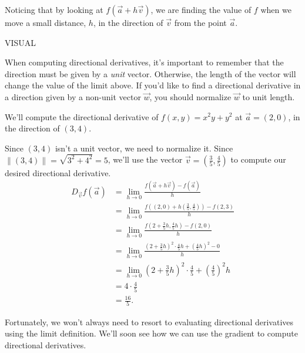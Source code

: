 \documentclass{ximera}
\begin{document}
Noticing that by looking at $f(\vec{a}+h\vec{v})$, we are finding the value of $f$ when we move a small distance, $h$, in the direction of $\vec{v}$ from the point $\vec{a}$.

VISUAL

When computing directional derivatives, it's important to remember that the direction must be given by a \emph{unit} vector. Otherwise, the length of the vector will change the value of the limit above. If you'd like to find a directional derivative in a direction given by a non-unit vector $\vec{w}$, you should normalize $\vec{w}$ to unit length.

\begin{example}
We'll compute the directional derivative of $f(x,y) = x^2y+y^2$ at $\vec{a}=(2,0)$, in the direction of $(3,4)$.

Since $(3,4)$ isn't a unit vector, we need to normalize it. Since $\|(3,4)\| = \sqrt{3^2+4^2}=5$, we'll use the vector $\vec{v}=\left(\frac{3}{5},\frac{4}{5}\right)$ to compute our desired directional derivative.
\begin{align*}
D_{\vec{v}}f(\vec{a}) &= \lim_{h\rightarrow 0}\frac{f(\vec{a}+h\vec{v})-f(\vec{a})}{h}\\
&= \lim_{h\rightarrow 0}\frac{f\left((2,0) + h\left(\frac{3}{5},\frac{4}{5}\right)\right)-f(2,3)}{h}\\
&= \lim_{h\rightarrow 0}\frac{f\left(2+\frac{3}{5}h,\frac{4}{5}h \right)-f(2,0)}{h}\\
&= \lim_{h\rightarrow 0}\frac{\left(2+\frac{3}{5}h\right)^2\cdot \frac{4}{5}h + \left(\frac{4}{5}h\right)^2-0}{h}\\
&= \lim_{h\rightarrow 0}\left(2+\frac{3}{5}h\right)^2\cdot \frac{4}{5} + \left(\frac{4}{5}\right)^2h\\
&= 4\cdot \frac{4}{5}\\
&= \frac{16}{5}.
\end{align*}
\end{example}

Fortunately, we won't always need to resort to evaluating directional derivatives using the limit definition. We'll soon see how we can use the gradient to compute directional derivatives.
\end{document}
